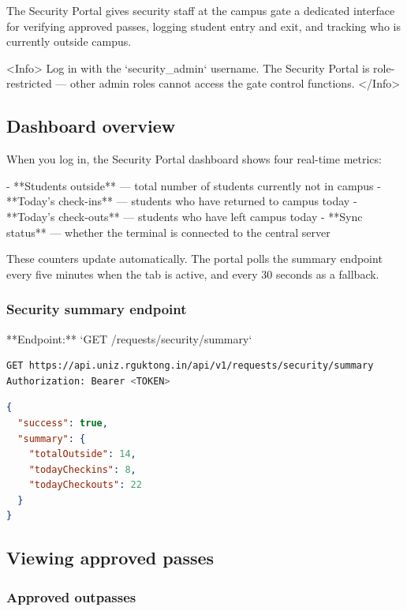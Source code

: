 


The Security Portal gives security staff at the campus gate a dedicated interface for verifying approved passes, logging student entry and exit, and tracking who is currently outside campus.

<Info>
  Log in with the `security_admin` username. The Security Portal is
  role-restricted — other admin roles cannot access the gate control functions.
</Info>

\subsection{Dashboard overview}

When you log in, the Security Portal dashboard shows four real-time metrics:

- **Students outside** — total number of students currently not in campus
- **Today's check-ins** — students who have returned to campus today
- **Today's check-outs** — students who have left campus today
- **Sync status** — whether the terminal is connected to the central server

These counters update automatically. The portal polls the summary endpoint every five minutes when the tab is active, and every 30 seconds as a fallback.

\subsubsection{Security summary endpoint}

**Endpoint:** `GET /requests/security/summary`

\begin{lstlisting}[language=bash]
GET https://api.uniz.rguktong.in/api/v1/requests/security/summary
Authorization: Bearer <TOKEN>

\end{lstlisting}

\begin{lstlisting}[language=json]
{
  "success": true,
  "summary": {
    "totalOutside": 14,
    "todayCheckins": 8,
    "todayCheckouts": 22
  }
}

\end{lstlisting}

\subsection{Viewing approved passes}

\subsubsection{Approved outpasses}

